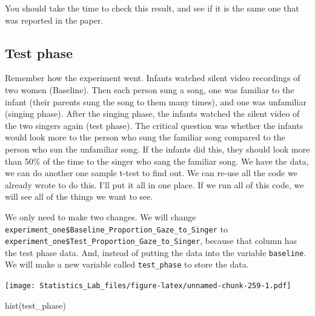 \documentclass[
]{book}
\newenvironment{Shaded}{\begin{snugshade}}{\end{snugshade}}
\newcommand{\FunctionTok}[1]{\textcolor[rgb]{0.00,0.00,0.00}{#1}}
\newcommand{\NormalTok}[1]{#1}
\newcommand{\OtherTok}[1]{\textcolor[rgb]{0.56,0.35,0.01}{#1}}
\newcommand{\SpecialCharTok}[1]{\textcolor[rgb]{0.00,0.00,0.00}{#1}}
\begin{document}
You should take the time to check this result, and see if it is the same one that was reported in the paper.

\hypertarget{test-phase}{%
\subsection{Test phase}\label{test-phase}}

Remember how the experiment went. Infants watched silent video recordings of two women (Baseline). Then each person sung a song, one was familiar to the infant (their parents sung the song to them many times), and one was unfamiliar (singing phase). After the singing phase, the infants watched the silent video of the two singers again (test phase). The critical question was whether the infants would look more to the person who sung the familiar song compared to the person who sun the unfamiliar song. If the infants did this, they should look more than 50\% of the time to the singer who sang the familiar song. We have the data, we can do another one sample t-test to find out. We can re-use all the code we already wrote to do this. I'll put it all in one place. If we run all of this code, we will see all of the things we want to see.

We only need to make two changes. We will change \texttt{experiment\_one\$Baseline\_Proportion\_Gaze\_to\_Singer} to \texttt{experiment\_one\$Test\_Proportion\_Gaze\_to\_Singer}, because that column has the test phase data. And, instead of putting the data into the variable \texttt{baseline}. We will make a new variable called \texttt{test\_phase} to store the data.

\begin{Shaded}
\end{Shaded}

\texttt{[image: Statistics\_Lab\_files/figure-latex/unnamed-chunk-259-1.pdf]}

\begin{Shaded}
\begin{Highlighting}[]
\FunctionTok{hist}\NormalTok{(test\_phase)}
\end{Highlighting}
\end{Shaded}
\end{document}
